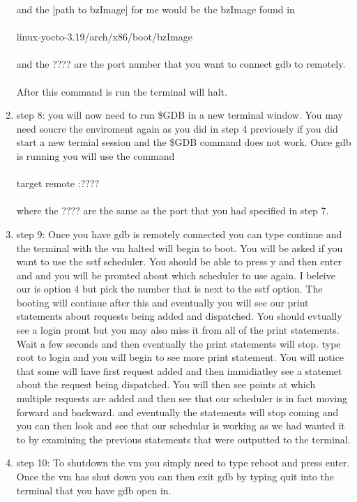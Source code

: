 \documentclass[letterpaper,10pt,titlepage]{article}
\begin{document}
\begin{enumerate}
   and the [path to bzImage] for me would be the bzImage found in\\\\
   linux-yocto-3.19/arch/x86/boot/bzImage\\\\
   and the ???? are the port number that you want to connect gdb to remotely.\\\\
   After this command is run the terminal will halt.
\item{step 8: }
   you will now need to run \$GDB in a new terminal window. You may need soucre 
   the enviroment again as you did in step 4 previously if you did start a new 
   termial session and the \$GDB command does not work. Once gdb is running you 
   will use the command\\\\
   target remote :????\\\\
   where the ???? are the same as the port that you had specified in step 7.
\item{step 9: }
   Once you have gdb is remotely connected you can type continue and the terminal 
   with the vm halted will begin to boot. You will be asked if you want to use the 
   sstf scheduler. You should be able to press y and then enter and and you will 
   be promted about which scheduler to use again. I beleive our is option 4 but 
   pick the number that is next to the sstf option. The booting will continue 
   after this and eventually you will see our print statements about requests being 
   added and dispatched. You should evtually see a login promt but you may also miss 
   it from all of the print statements. Wait a few seconds and then eventually the 
   print statements will stop. type root to login and you will begin to see more 
   print statement. You will notice that some will have first request added and 
   then immidiatley see a statemet about the request being dispatched. You will 
   then see points at which multiple requests are added and then see that our 
   scheduler is in fact moving forward and backward. and eventually the statements 
   will stop coming and you can then look and see that our schedular is working as 
   we had wanted it to by examining the previous statements that were outputted to 
   the terminal.
\item{step 10: }
   To shutdown the vm you simply need to type reboot and press enter. Once the 
   vm has shut down you can then exit gdb by typing quit into the terminal that 
   you have gdb open in.
   
\end{enumerate}
\end{document}
